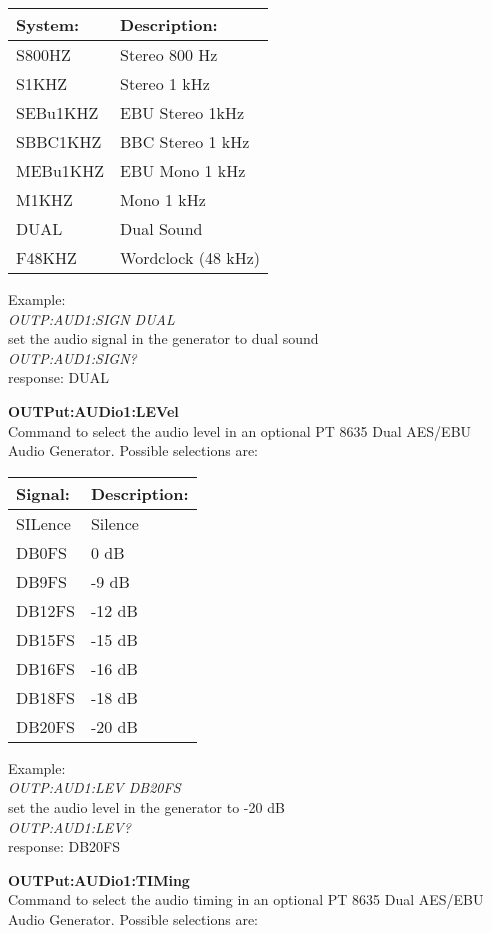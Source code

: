 \begin{tabular}{|l|l|}
\hline
System:		& Description: \\ \hline
S800HZ		& Stereo 800 Hz\\ \hline
S1KHZ			& Stereo 1 kHz\\ \hline
SEBu1KHZ	& EBU Stereo 1kHz\\ \hline
SBBC1KHZ	& BBC Stereo 1 kHz\\ \hline
MEBu1KHZ	& EBU Mono 1 kHz\\ \hline
M1KHZ			& Mono 1 kHz\\ \hline
DUAL			& Dual Sound\\ \hline
F48KHZ		& Wordclock (48 kHz)\\ \hline
\end{tabular}

Example:\\
\textit{OUTP:AUD1:SIGN DUAL}\\
set the audio signal in the generator to dual sound\\
\textit{OUTP:AUD1:SIGN?}\\
response: DUAL

\textbf{OUTPut:AUDio1:LEVel}\\
Command to select the audio level in an optional PT 8635 Dual AES/EBU Audio Generator. Possible selections are:

\begin{tabular}{|l|l|}
\hline
Signal:		& Description: \\ \hline
SILence		& Silence \\ \hline
DB0FS			& 0 dB \\ \hline
DB9FS			& -9 dB \\ \hline
DB12FS		& -12 dB \\ \hline
DB15FS		& -15 dB \\ \hline
DB16FS		& -16 dB \\ \hline
DB18FS		& -18 dB \\ \hline
DB20FS		& -20 dB \\ \hline
\end{tabular}

Example:\\
\textit{OUTP:AUD1:LEV DB20FS}\\
set the audio level in the generator to -20 dB\\
\textit{OUTP:AUD1:LEV?}\\
response: DB20FS

\textbf{OUTPut:AUDio1:TIMing}\\
Command to select the audio timing in an optional PT 8635 Dual AES/EBU Audio Generator. Possible selections are:

